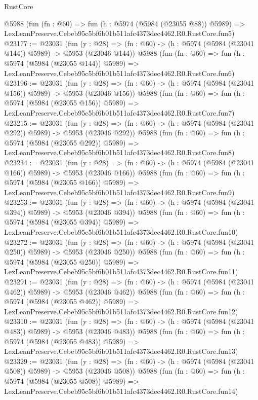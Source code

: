 \begin{lexlean}{RustCore}
\begin{coremodule}
    @5988
    (fun (fn : @60) =>
    fun (h : @5974 (@5984 (@23055 @88)) @5989) =>
    LexLeanPreserve.Cebeb95c5bf6b01b511afc4373dec4462.R0.RustCore.fun5)
@23177 := @23031
    (fun (y : @28) => (fn : @60) -> (h : @5974 (@5984 (@23041 @144)) @5989) -> @5953 (@23046 @144))
    @5988
    (fun (fn : @60) =>
    fun (h : @5974 (@5984 (@23055 @144)) @5989) =>
    LexLeanPreserve.Cebeb95c5bf6b01b511afc4373dec4462.R0.RustCore.fun6)
@23196 := @23031
    (fun (y : @28) => (fn : @60) -> (h : @5974 (@5984 (@23041 @156)) @5989) -> @5953 (@23046 @156))
    @5988
    (fun (fn : @60) =>
    fun (h : @5974 (@5984 (@23055 @156)) @5989) =>
    LexLeanPreserve.Cebeb95c5bf6b01b511afc4373dec4462.R0.RustCore.fun7)
@23215 := @23031
    (fun (y : @28) => (fn : @60) -> (h : @5974 (@5984 (@23041 @292)) @5989) -> @5953 (@23046 @292))
    @5988
    (fun (fn : @60) =>
    fun (h : @5974 (@5984 (@23055 @292)) @5989) =>
    LexLeanPreserve.Cebeb95c5bf6b01b511afc4373dec4462.R0.RustCore.fun8)
@23234 := @23031
    (fun (y : @28) => (fn : @60) -> (h : @5974 (@5984 (@23041 @166)) @5989) -> @5953 (@23046 @166))
    @5988
    (fun (fn : @60) =>
    fun (h : @5974 (@5984 (@23055 @166)) @5989) =>
    LexLeanPreserve.Cebeb95c5bf6b01b511afc4373dec4462.R0.RustCore.fun9)
@23253 := @23031
    (fun (y : @28) => (fn : @60) -> (h : @5974 (@5984 (@23041 @394)) @5989) -> @5953 (@23046 @394))
    @5988
    (fun (fn : @60) =>
    fun (h : @5974 (@5984 (@23055 @394)) @5989) =>
    LexLeanPreserve.Cebeb95c5bf6b01b511afc4373dec4462.R0.RustCore.fun10)
@23272 := @23031
    (fun (y : @28) => (fn : @60) -> (h : @5974 (@5984 (@23041 @250)) @5989) -> @5953 (@23046 @250))
    @5988
    (fun (fn : @60) =>
    fun (h : @5974 (@5984 (@23055 @250)) @5989) =>
    LexLeanPreserve.Cebeb95c5bf6b01b511afc4373dec4462.R0.RustCore.fun11)
@23291 := @23031
    (fun (y : @28) => (fn : @60) -> (h : @5974 (@5984 (@23041 @462)) @5989) -> @5953 (@23046 @462))
    @5988
    (fun (fn : @60) =>
    fun (h : @5974 (@5984 (@23055 @462)) @5989) =>
    LexLeanPreserve.Cebeb95c5bf6b01b511afc4373dec4462.R0.RustCore.fun12)
@23310 := @23031
    (fun (y : @28) => (fn : @60) -> (h : @5974 (@5984 (@23041 @483)) @5989) -> @5953 (@23046 @483))
    @5988
    (fun (fn : @60) =>
    fun (h : @5974 (@5984 (@23055 @483)) @5989) =>
    LexLeanPreserve.Cebeb95c5bf6b01b511afc4373dec4462.R0.RustCore.fun13)
@23329 := @23031
    (fun (y : @28) => (fn : @60) -> (h : @5974 (@5984 (@23041 @508)) @5989) -> @5953 (@23046 @508))
    @5988
    (fun (fn : @60) =>
    fun (h : @5974 (@5984 (@23055 @508)) @5989) =>
    LexLeanPreserve.Cebeb95c5bf6b01b511afc4373dec4462.R0.RustCore.fun14)

\end{coremodule}
\end{lexlean}
